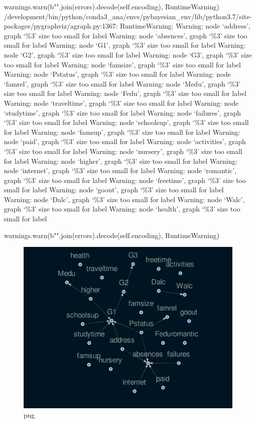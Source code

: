 \documentclass[
]{article}
\begin{document}
warnings.warn(b"".join(errors).decode(self.encoding), RuntimeWarning)
/development/bin/python/conda3\_ana/envs/pybayesian\_env/lib/python3.7/site-packages/pygraphviz/agraph.py:1367:
RuntimeWarning: Warning: node `address', graph `\%3' size too small for
label Warning: node `absences', graph `\%3' size too small for label
Warning: node `G1', graph `\%3' size too small for label Warning: node
`G2', graph `\%3' size too small for label Warning: node `G3', graph
`\%3' size too small for label Warning: node `famsize', graph `\%3' size
too small for label Warning: node `Pstatus', graph `\%3' size too small
for label Warning: node `famrel', graph `\%3' size too small for label
Warning: node `Medu', graph `\%3' size too small for label Warning: node
`Fedu', graph `\%3' size too small for label Warning: node `traveltime',
graph `\%3' size too small for label Warning: node `studytime', graph
`\%3' size too small for label Warning: node `failures', graph `\%3'
size too small for label Warning: node `schoolsup', graph `\%3' size too
small for label Warning: node `famsup', graph `\%3' size too small for
label Warning: node `paid', graph `\%3' size too small for label
Warning: node `activities', graph `\%3' size too small for label
Warning: node `nursery', graph `\%3' size too small for label Warning:
node `higher', graph `\%3' size too small for label Warning: node
`internet', graph `\%3' size too small for label Warning: node
`romantic', graph `\%3' size too small for label Warning: node
`freetime', graph `\%3' size too small for label Warning: node `goout',
graph `\%3' size too small for label Warning: node `Dalc', graph `\%3'
size too small for label Warning: node `Walc', graph `\%3' size too
small for label Warning: node `health', graph `\%3' size too small for
label

warnings.warn(b"".join(errors).decode(self.encoding), RuntimeWarning)

\begin{figure}
\centering
\includegraphics{FirstCausalNexTutorial_files/FirstCausalNexTutorial_42_1.png}
\caption{png}
\end{figure}
\end{document}
